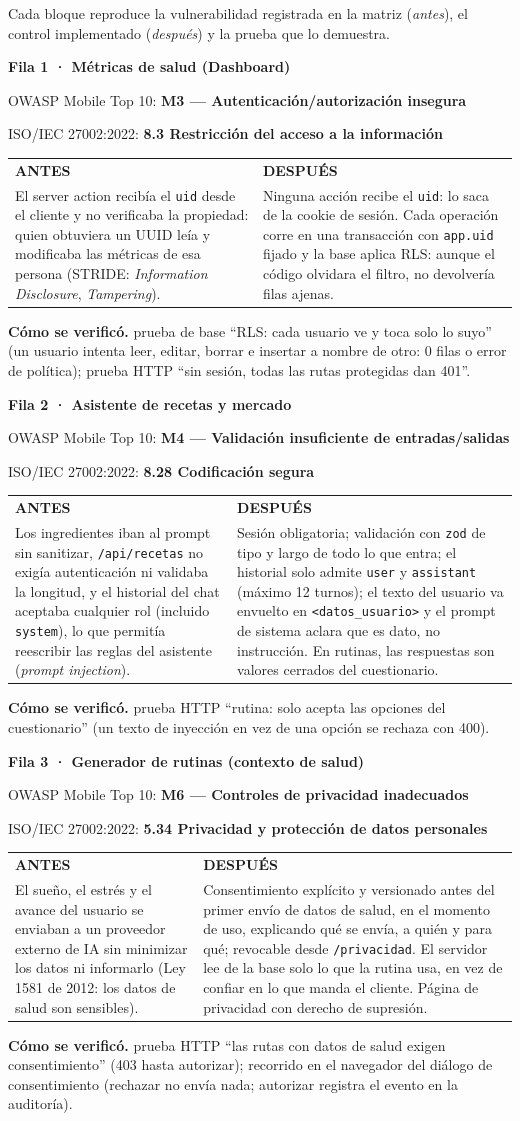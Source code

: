 \documentclass[11pt,letterpaper]{article}
\makeatletter
\newcommand{\cod}[1]{\texttt{#1}}
\newcommand{\fila}[7]{%
  \par\vspace{8pt}\noindent
  \begin{minipage}{\linewidth}%
  {\large\bfseries\color{tinta}Fila #1 · #2}\par\vspace{2pt}
  {\small\color{gris}OWASP Mobile Top 10: \textbf{#3}\par
   ISO/IEC 27002:2022: \textbf{#4}\par}\vspace{4pt}
  \renewcommand{\arraystretch}{1.25}%
  \begin{tabularx}{\linewidth}{@{}>{\raggedright\arraybackslash\small}X@{\hspace{6pt}}>{\raggedright\arraybackslash\small}X@{}}
    \cellcolor{antesbg}\textbf{\color{antes}ANTES} & \cellcolor{despuesbg}\textbf{\color{despues}DESPUÉS} \\
    \cellcolor{antesbg}#5 & \cellcolor{despuesbg}#6 \\
  \end{tabularx}\par\vspace{3pt}
  {\small\textbf{Cómo se verificó.} #7}\par
  \end{minipage}\par\vspace{4pt}
}
\makeatother
\begin{document}
Cada bloque reproduce la vulnerabilidad registrada en la matriz (\textit{antes}),
el control implementado (\textit{después}) y la prueba que lo demuestra.

\fila{1}{Métricas de salud (Dashboard)}{M3 — Autenticación/autorización insegura}{8.3 Restricción del acceso a la información}
{El server action recibía el \cod{uid} desde el cliente y no verificaba la propiedad: quien obtuviera un UUID leía y modificaba las métricas de esa persona (STRIDE: \textit{Information Disclosure}, \textit{Tampering}).}
{Ninguna acción recibe el \cod{uid}: lo saca de la cookie de sesión. Cada operación corre en una transacción con \cod{app.uid} fijado y la base aplica RLS: aunque el código olvidara el filtro, no devolvería filas ajenas.}
{prueba de base ``RLS: cada usuario ve y toca solo lo suyo'' (un usuario intenta leer, editar, borrar e insertar a nombre de otro: 0 filas o error de política); prueba HTTP ``sin sesión, todas las rutas protegidas dan 401''.}

\fila{2}{Asistente de recetas y mercado}{M4 — Validación insuficiente de entradas/salidas}{8.28 Codificación segura}
{Los ingredientes iban al prompt sin sanitizar, \cod{/api/recetas} no exigía autenticación ni validaba la longitud, y el historial del chat aceptaba cualquier rol (incluido \cod{system}), lo que permitía reescribir las reglas del asistente (\textit{prompt injection}).}
{Sesión obligatoria; validación con \cod{zod} de tipo y largo de todo lo que entra; el historial solo admite \cod{user} y \cod{assistant} (máximo 12 turnos); el texto del usuario va envuelto en \cod{<datos\_usuario>} y el prompt de sistema aclara que es dato, no instrucción. En rutinas, las respuestas son valores cerrados del cuestionario.}
{prueba HTTP ``rutina: solo acepta las opciones del cuestionario'' (un texto de inyección en vez de una opción se rechaza con 400).}

\fila{3}{Generador de rutinas (contexto de salud)}{M6 — Controles de privacidad inadecuados}{5.34 Privacidad y protección de datos personales}
{El sueño, el estrés y el avance del usuario se enviaban a un proveedor externo de IA sin minimizar los datos ni informarlo (Ley 1581 de 2012: los datos de salud son sensibles).}
{Consentimiento explícito y versionado antes del primer envío de datos de salud, en el momento de uso, explicando qué se envía, a quién y para qué; revocable desde \cod{/privacidad}. El servidor lee de la base solo lo que la rutina usa, en vez de confiar en lo que manda el cliente. Página de privacidad con derecho de supresión.}
{prueba HTTP ``las rutas con datos de salud exigen consentimiento'' (403 hasta autorizar); recorrido en el navegador del diálogo de consentimiento (rechazar no envía nada; autorizar registra el evento en la auditoría).}
\end{document}
